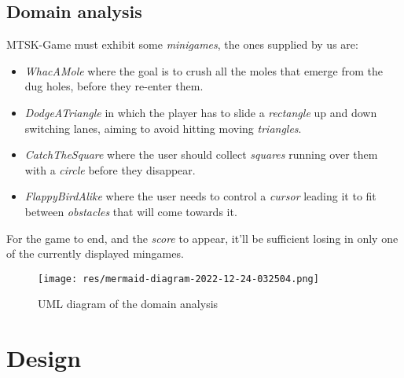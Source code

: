 \documentclass[a4paper,12pt]{report}
\begin{document}
\section{Domain analysis}

MTSK-Game must exhibit some \textit{minigames}, the ones supplied by us are:
\begin{itemize} 
	\item \textit{WhacAMole} where the goal is to crush all the moles that emerge from the dug holes, before they re-enter them.
	\item \textit{DodgeATriangle} in which the player has to slide a \textit{rectangle} up and down switching lanes, aiming to avoid hitting moving \textit{triangles}.
	\item \textit{CatchTheSquare} where the user should collect \textit{squares} running over them with a \textit{circle} before they disappear.
	\item \textit{FlappyBirdAlike} where the user needs to control a \textit{cursor} leading it to fit between \textit{obstacles} that will come towards it.
\end{itemize}
For the game to end, and the \textit{score} to appear, it'll be sufficient losing in only one of the currently displayed mingames.


\begin{figure}[ht]
	\centering{}
	\texttt{[image: res/mermaid-diagram-2022-12-24-032504.png]}
	\caption{UML diagram of the domain analysis}
\end{figure}

\chapter{Design}
\end{document}
